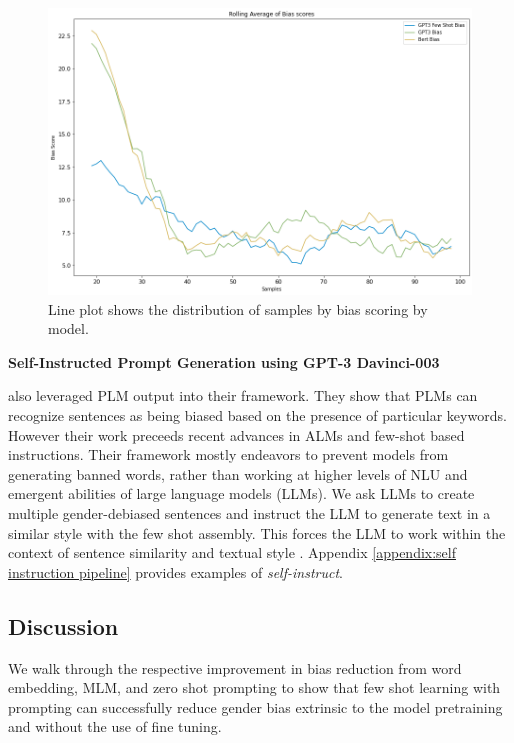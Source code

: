 \documentclass[11pt]{article}
\begin{document}
\begin{figure}
  \includegraphics[width=1\linewidth]{img/avg-bias-scores.png}
  \caption{Line plot shows the distribution of samples by bias scoring by model.}
  \label{fig:avg-bias-scores}
\end{figure}

\textbf{Self-Instructed Prompt Generation using GPT-3 Davinci-003}

\citealp[in their paper \emph{Self-diagnosis and self-debiasing: A proposal for reducing corpus-based bias in nlp}]{schick2021self:21} also leveraged PLM output into their framework. They show that PLMs can recognize sentences as being biased based on the presence of particular keywords. However their work preceeds recent advances in ALMs and few-shot based instructions. Their framework mostly endeavors to prevent models from generating banned words, rather than working at higher levels of NLU and emergent abilities of large language models (LLMs). We ask LLMs to create multiple gender-debiased sentences and instruct the LLM to generate text in a similar style with the few shot assembly. This forces the LLM to work within the context of sentence similarity and textual style \citep{suzgun2022prompt:22}. Appendix \ref{appendix:self instruction pipeline} provides examples of \emph{self-instruct}.
\subsection{Discussion}
We walk through the respective improvement in bias reduction from word embedding, MLM, and zero shot prompting to show that few shot learning with prompting can successfully reduce gender bias extrinsic to the model pretraining and without the use of fine tuning.
\end{document}
